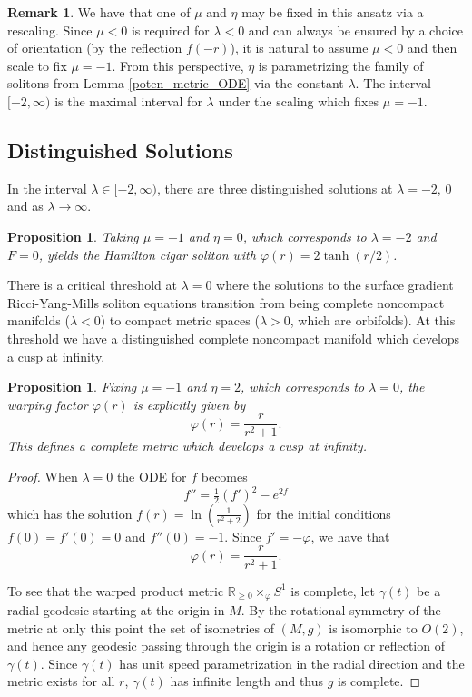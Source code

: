 \documentclass[12pt, a4paper, reqno, oneside]{amsart}
\newcommand{\R}{\mathbb{R}}
\renewcommand{\phi}{\varphi}
\numberwithin{equation}{section}
\theoremstyle{plain}
\newtheorem{proposition}[theorem]{Proposition}
\theoremstyle{definition}
\newtheorem{remark}[theorem]{Remark}
\theoremstyle{plain}
\begin{document}
\begin{remark}
  We have that one of $\mu$ and $\eta$ may be fixed in this ansatz via a rescaling. Since $\mu<0$ is required for $\lambda<0$ and can always be ensured by a choice of orientation (by the reflection $f(-r)$), it is natural to assume $\mu<0$ and then scale to fix $\mu=-1$. From this perspective, $\eta$ is parametrizing the family of solitons from Lemma \ref{poten_metric_ODE} via the constant $\lambda$. The interval $[-2,\infty)$ is the maximal interval for $\lambda$ under the scaling which fixes $\mu=-1$.
\end{remark}

\subsection{Distinguished Solutions}
In the interval $\lambda\in[-2,\infty)$, there are three distinguished solutions at $\lambda=-2$, 0 and as $\lambda\to\infty$.

\begin{proposition}
  Taking $\mu=-1$ and $\eta=0$, which corresponds to $\lambda=-2$ and $F=0$, yields the Hamilton cigar soliton with $\phi(r) = 2\tanh(r/2)$.
\end{proposition}

There is a critical threshold at $\lambda=0$ where the solutions to the surface gradient Ricci-Yang-Mills soliton equations transition from being complete noncompact manifolds ($\lambda<0$) to compact metric spaces ($\lambda>0$, which are orbifolds). At this threshold we have a distinguished complete noncompact manifold which develops a cusp at infinity.

\begin{proposition}
  Fixing $\mu=-1$ and $\eta=2$, which corresponds to $\lambda=0$, the warping factor $\phi(r)$ is explicitly given by
  \[
    \phi(r) = \frac{r}{r^{2}+1}.
  \]
  This defines a complete metric which develops a cusp at infinity.
\end{proposition}
\begin{proof}
  When $\lambda=0$ the ODE for $f$ becomes
  \[
    f'' = \tfrac{1}{2}(f')^{2}-e^{2f}
  \]
  which has the solution $f(r) = \ln\left(\tfrac{1}{r^{2}+2}\right)$ for the initial conditions $f(0)=f'(0)=0$ and $f''(0)=-1$. Since $f'=-\phi$, we have that 
  \[
    \phi(r) = \frac{r}{r^{2}+1}.
  \]

  To see that the warped product metric $\R_{\geq 0}\times_{\phi}S^{1}$ is complete, let $\gamma(t)$ be a radial geodesic starting at the origin in $M$. By the rotational symmetry of the metric at only this point the set of isometries of $(M,g)$ is isomorphic to $O(2)$, and hence any geodesic passing through the origin is a rotation or reflection of $\gamma(t)$. Since $\gamma(t)$ has unit speed parametrization in the radial direction and the metric exists for all $r$, $\gamma(t)$ has infinite length and thus $g$ is complete.
\end{proof}
\end{document}
